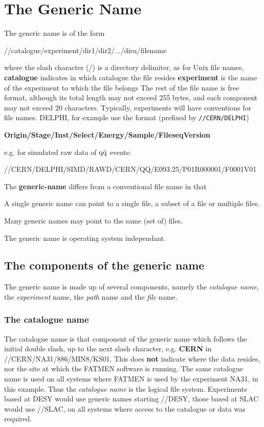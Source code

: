 \section{The Generic Name}\label{GNAME}
\par
{}
The generic name is of the form
\begin{XMP}
//catalogue/experiment/dir1/dir2/.../dirn/filename
\end{XMP}
where
the slash character (/) is a directory delimiter, as for Unix file names,
{\bf catalogue} indicates in which catalogue the file resides
{\bf experiment} is the name of the experiment to which the file
belongs
The rest of the file name is free format, although its total length
may not exceed 255 bytes, and each component may not exceed
20 characters. Typically, experiments will have conventions
for file names. DELPHI, for example use the format
(prefixed by {\tt //CERN/DELPHI})
\begin{XMP}
{\bf Origin/Stage/Inst/Select/Energy/Sample/FileseqVersion}
\end{XMP}
e.g. for simulated raw data of $\rm q \bar{q}$ events:
\begin{XMP}
//CERN/DELPHI/SIMD/RAWD/CERN/QQ/E093.25/P01R000001/F0001V01
\end{XMP}
The {\bf generic-name} differs from a conventional
file name in that
\begin{OL}
\item A single generic name can point to a single file, a subset of a file
or multiple files.
\item Many generic names may point to the same (set of) files.
\item The generic name is operating system independant.
\end{OL}
\subsection{The components of the generic name}
\par
The generic name is made up of several components, namely the
{\it catalogue name}, the {\it experiment} name,
the {\it path} name and the {\it file} name.
\subsubsection{The catalogue name}
\par
The catalogue name is that component of the generic name which
follows the initial double slash, up to the next slash character,
e.g. {\bf CERN} in //CERN/NA31/886/MIN8/KS01. This does
{\bf not} indicate where the data resides, nor the site
at which the FATMEN software is running. The same catalogue
name is used on all systems where FATMEN is used by the experiment
NA31, in this example. Thus the {\it catalogue name} is the
logical file system. Experiments based at DESY would use generic
names starting //DESY, those based at SLAC would use //SLAC,
on all systems where access to the catalogue or data was required.
